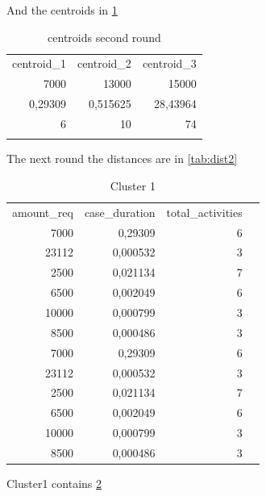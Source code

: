 \documentclass{article}
\begin{document}
And the centroids in \ref{tab:cent2}
\begin{table}[ht]
  \centering
  \caption{centroids second round}
    \begin{tabular}{rrr}
    \multicolumn{1}{l}{centroid\_1} & \multicolumn{1}{l}{centroid\_2} & \multicolumn{1}{l}{centroid\_3} \\
    7000  & 13000 & 15000 \\
    0,29309 & 0,515625 & 28,43964 \\
    6     & 10    & 74 \\
          &       &  \\
    \end{tabular}%
  \label{tab:cent2}%
\end{table}%
The next round the distances are in \ref{tab:dist2}


\begin{table}[ht]
  \centering
  \caption{Cluster 1}
    \begin{tabular}{rrrr}
    \multicolumn{1}{l}{amount\_req} & \multicolumn{1}{l}{case\_duration} & \multicolumn{1}{l}{total\_activities} &  \\
    7000  & 0,29309 & 6     &  \\
    23112 & 0,000532 & 3     &  \\
    2500  & 0,021134 & 7     &  \\
    6500  & 0,002049 & 6     &  \\
    10000 & 0,000799 & 3     &  \\
    8500  & 0,000486 & 3     &  \\
    7000  & 0,29309 & 6     &  \\
    23112 & 0,000532 & 3     &  \\
    2500  & 0,021134 & 7     &  \\
    6500  & 0,002049 & 6     &  \\
    10000 & 0,000799 & 3     &  \\
    8500  & 0,000486 & 3     &  \\
    \end{tabular}%
  \label{tab:clust1}%
\end{table}%
Cluster1 contains \ref{tab:clust1}
\end{document}
